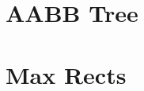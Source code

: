 \section{AABB Tree}\label{chapter:heuristics:aabbtree}

\section{Max Rects}\label{chapter:heuristics:maxrects}
